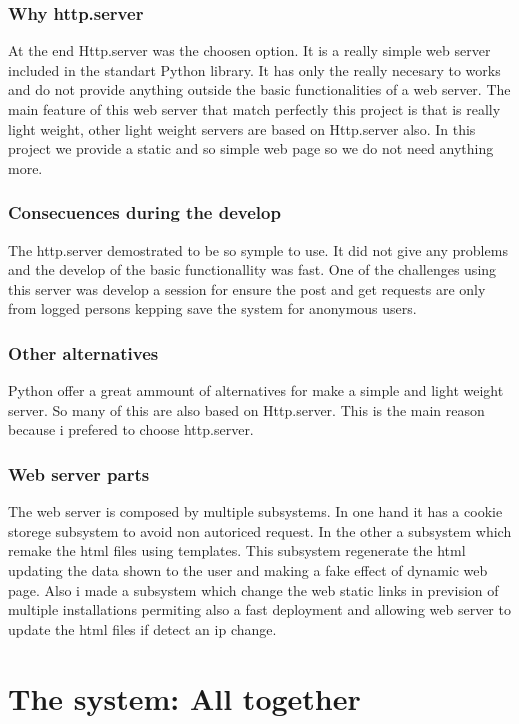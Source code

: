 		\subsection{Why http.server}
		At the end Http.server was the choosen option. It is a really simple web server included in the standart Python library. It has only the really necesary to works and do not provide anything outside the basic functionalities of a web server. The main feature of this web server that match perfectly this project is that is really light weight, other light weight servers are based on Http.server also. In this project we provide a static and so simple web page so we do not need anything more.
		\subsection{Consecuences during the develop}%
		The http.server demostrated to be so symple to use. It did not give any problems and the develop of the basic functionallity was fast. One of the challenges using this server was develop a session for ensure the post and get requests are only from logged persons kepping save the system for anonymous users.
		\subsection{Other alternatives}%
		Python offer a great ammount of alternatives for make a simple and light weight server. So many of this are also based on Http.server. This is the main reason because i prefered to choose http.server.
		\subsection{Web server parts}%
		The web server is composed by multiple subsystems. 
		In one hand it has a cookie storege subsystem to avoid non autoriced request.
		In the other a subsystem which remake the html files using templates. This subsystem regenerate the html updating the data shown to the user and making a fake effect of dynamic web page.
		Also i made a subsystem which change the web static links in prevision of multiple installations permiting also a fast deployment and allowing web server to update the html files if detect an ip change.

\chapter{The system: All together}
